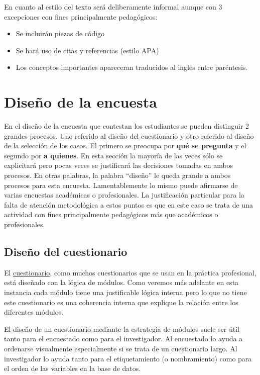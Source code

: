 \documentclass[
]{book}
\theoremstyle{definition}
\theoremstyle{definition}
\theoremstyle{definition}
\theoremstyle{definition}
\theoremstyle{remark}
\begin{document}
En cuanto al estilo del texto será deliberamente informal aunque con 3 excepciones con fines principalmente pedagógicos:

\begin{itemize}
\item
  Se incluirán piezas de código
\item
  Se hará uso de citas y referencias (estilo APA)
\item
  Los conceptos importantes apareceran traducidos al ingles entre paréntesis.
\end{itemize}

\hypertarget{diseuxf1o-de-la-encuesta}{%
\chapter{Diseño de la encuesta}\label{diseuxf1o-de-la-encuesta}}

En el diseño de la encuesta que contestan los estudiantes se pueden distinguir 2 grandes procesos. Uno referido al diseño del cuestionario y otro referido al diseño de la selección de los casos. El primero se preocupa por \textbf{qué se pregunta} y el segundo por \textbf{a quienes}. En esta sección la mayoría de las veces sólo se explicitará pero pocas veces se justificará las decisiones tomadas en ambos procesos. En otras palabras, la palabra ``diseño'' le queda grande a ambos procesos para esta encuesta. Lamentablemente lo mismo puede afirmarse de varias encuestas académicas o profesionales. La justificación particular para la falta de atención metodológica a estos puntos es que en este caso se trata de una actividad con fines principalmente pedagógicos más que académicos o profesionales.

\hypertarget{diseuxf1o-del-cuestionario}{%
\section{Diseño del cuestionario}\label{diseuxf1o-del-cuestionario}}

El \href{https://drive.google.com/file/d/1nbU16-b2RxvPQZV2SS-Aodl1d7zPr9Cw/view?usp=sharing}{cuestionario}, como muchos cuestionarios que se usan en la práctica profesional, está diseñado con la lógica de módulos. Como veremos más adelante en esta instancia cada módulo tiene una justificable lógica interna pero lo que no tiene este cuestionario es una coherencia interna que explique la relación entre los diferentes módulos.

El diseño de un cuestionario mediante la estrategia de módulos suele ser útil tanto para el encuestado como para el investigador. Al encuestado lo ayuda a ordenarse visualmente especialmente si se trata de un cuestionario largo. Al investigador lo ayuda tanto para el etiquetamiento (o nombramiento) como para el orden de las variables en la base de datos.
\end{document}
